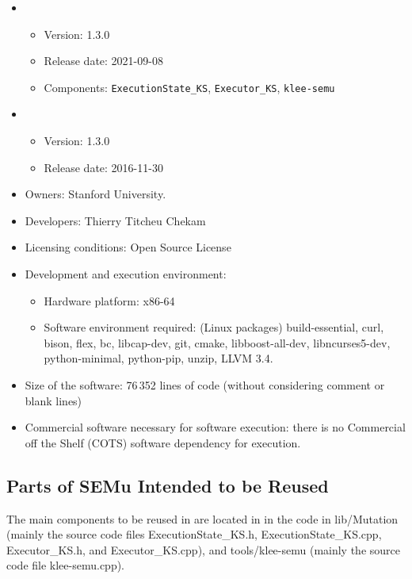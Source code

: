 \begin{itemize}
	\item {}
	\begin{itemize}
		\item Version: 1.3.0
		\item Release date: 2021-09-08
		\item Components: \texttt{ExecutionState\_KS}, \texttt{Executor\_KS}, \texttt{klee-semu}
	\end{itemize}
	\item {}
	\begin{itemize}
		\item Version: 1.3.0
		\item Release date: 2016-11-30
	\end{itemize}
	\item Owners: Stanford University.
	\item Developers: Thierry Titcheu Chekam
	\item Licensing conditions: Open Source License
	\item Development and execution environment:
	\begin{itemize}
		\item Hardware platform: x86-64
		\item Software environment required: (Linux packages) build-essential, curl, bison, flex, bc, libcap-dev, git, cmake, libboost-all-dev, libncurses5-dev, python-minimal, python-pip, unzip, LLVM 3.4.
	\end{itemize}
	\item Size of the software: 76\,352 lines of code (without considering comment or blank lines)
	\item Commercial software necessary for software execution: there is no Commercial off the Shelf (COTS) software dependency for execution.
\end{itemize}

\subsection{Parts of SEMu Intended to be Reused}

The main components to be reused in \SEMUS are located in in the code in lib/Mutation (mainly the source code files ExecutionState\_KS.h, ExecutionState\_KS.cpp, Executor\_KS.h, and Executor\_KS.cpp), and tools/klee-semu (mainly the source code file klee-semu.cpp).


